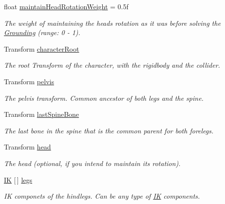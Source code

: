 \begin{DoxyCompactItemize}
float \mbox{\hyperlink{class_root_motion_1_1_final_i_k_1_1_grounder_quadruped_aac90017fa140ce1a04a24b55f2fd88be}{maintain\+Head\+Rotation\+Weight}} = 0.\+5f
\begin{DoxyCompactList}\small\item\em The weight of maintaining the head\textquotesingle{}s rotation as it was before solving the \mbox{\hyperlink{class_root_motion_1_1_final_i_k_1_1_grounding}{Grounding}} (range\+: 0 -\/ 1). \end{DoxyCompactList}\item 
Transform \mbox{\hyperlink{class_root_motion_1_1_final_i_k_1_1_grounder_quadruped_ad70def3d5184b754d565595486e05940}{character\+Root}}
\begin{DoxyCompactList}\small\item\em The root Transform of the character, with the rigidbody and the collider. \end{DoxyCompactList}\item 
Transform \mbox{\hyperlink{class_root_motion_1_1_final_i_k_1_1_grounder_quadruped_a30b84102626a5ba9a58511255e48df88}{pelvis}}
\begin{DoxyCompactList}\small\item\em The pelvis transform. Common ancestor of both legs and the spine. \end{DoxyCompactList}\item 
Transform \mbox{\hyperlink{class_root_motion_1_1_final_i_k_1_1_grounder_quadruped_a1e38165485263fbab858217c4ba27316}{last\+Spine\+Bone}}
\begin{DoxyCompactList}\small\item\em The last bone in the spine that is the common parent for both forelegs. \end{DoxyCompactList}\item 
Transform \mbox{\hyperlink{class_root_motion_1_1_final_i_k_1_1_grounder_quadruped_afd3aebf64eb863401c0c32a3586514c6}{head}}
\begin{DoxyCompactList}\small\item\em The head (optional, if you intend to maintain it\textquotesingle{}s rotation). \end{DoxyCompactList}\item 
\mbox{\hyperlink{class_root_motion_1_1_final_i_k_1_1_i_k}{IK}} \mbox{[}$\,$\mbox{]} \mbox{\hyperlink{class_root_motion_1_1_final_i_k_1_1_grounder_quadruped_a9730d74e7b4337aae310d93e3d69061a}{legs}}
\begin{DoxyCompactList}\small\item\em IK componets of the hindlegs. Can be any type of \mbox{\hyperlink{class_root_motion_1_1_final_i_k_1_1_i_k}{IK}} components. \end{DoxyCompactList}\item 

\end{DoxyCompactItemize}

